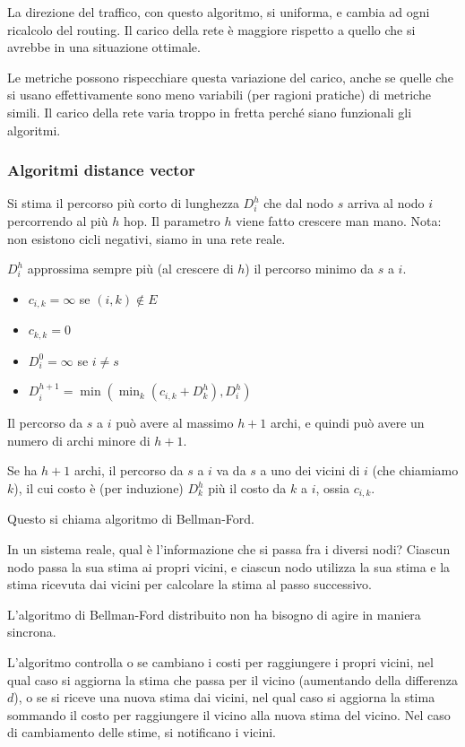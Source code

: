 La direzione del traffico, con questo algoritmo, si uniforma, e cambia ad ogni ricalcolo del routing. Il carico della rete \`e maggiore rispetto a quello che si avrebbe in una situazione ottimale.

Le metriche possono rispecchiare questa variazione del carico, anche se quelle che si usano effettivamente sono meno variabili (per ragioni pratiche) di metriche simili. Il carico della rete varia troppo in fretta perch\'e siano funzionali gli algoritmi.

\subsubsection{Algoritmi distance vector}

Si stima il percorso pi\`u corto di lunghezza $D^h_i$ che dal nodo $s$ arriva al nodo $i$ percorrendo al pi\`u $h$ hop. Il parametro $h$ viene fatto crescere man mano. Nota: non esistono cicli negativi, siamo in una rete reale.

$D^h_i$ approssima sempre pi\`u (al crescere di $h$) il percorso minimo da $s$ a $i$.
\begin{itemize}
    \item $c_{i,k} = \infty $ se $ (i,k) \notin E$
    \item $c_{k,k} = 0$
    \item $D^0_i = \infty $ se $ i \neq s$
    \item $D^{h+1}_i = \min( \min_k (c_{i,k} + D^h_k), D^h_i )$
\end{itemize}

Il percorso da $s$ a $i$ pu\`o avere al massimo $h+1$ archi, e quindi pu\`o avere un numero di archi minore di $h+1$.

Se ha $h+1$ archi, il percorso da $s$ a $i$ va da $s$ a uno dei vicini di $i$ (che chiamiamo $k$), il cui costo \`e (per induzione) $D^h_k$ pi\`u il costo da $k$ a $i$, ossia $c_{i,k}$.

Questo si chiama algoritmo di Bellman-Ford.

In un sistema reale, qual \`e l'informazione che si passa fra i diversi nodi? Ciascun nodo passa la sua stima ai propri vicini, e ciascun nodo utilizza la sua stima e la stima ricevuta dai vicini per calcolare la stima al passo successivo.

L'algoritmo di Bellman-Ford distribuito non ha bisogno di agire in maniera sincrona. 

L'algoritmo controlla o se cambiano i costi per raggiungere i propri vicini, nel qual caso si aggiorna la stima che passa per il vicino (aumentando della differenza $d$), o se si riceve una nuova stima dai vicini, nel qual caso si aggiorna la stima sommando il costo per raggiungere il vicino alla nuova stima del vicino. Nel caso di cambiamento delle stime, si notificano i vicini.

